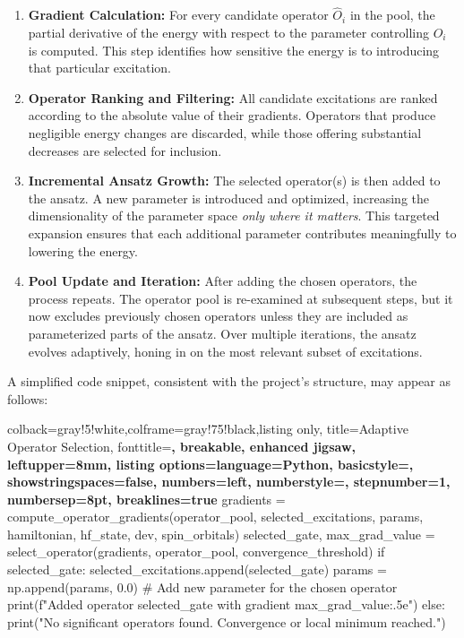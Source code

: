 \begin{enumerate}
    \item \textbf{Gradient Calculation:} For every candidate operator $\hat{O}_i$ in the pool, the partial derivative of the energy with respect to the parameter controlling $\hat{O}_i$ is computed. This step identifies how sensitive the energy is to introducing that particular excitation.
    \item \textbf{Operator Ranking and Filtering:} All candidate excitations are ranked according to the absolute value of their gradients. Operators that produce negligible energy changes are discarded, while those offering substantial decreases are selected for inclusion.
    \item \textbf{Incremental Ansatz Growth:} The selected operator(s) is then added to the ansatz. A new parameter is introduced and optimized, increasing the dimensionality of the parameter space \emph{only where it matters}. This targeted expansion ensures that each additional parameter contributes meaningfully to lowering the energy.
    \item \textbf{Pool Update and Iteration:} After adding the chosen operators, the process repeats. The operator pool is re-examined at subsequent steps, but it now excludes previously chosen operators unless they are included as parameterized parts of the ansatz. Over multiple iterations, the ansatz evolves adaptively, honing in on the most relevant subset of excitations.
\end{enumerate}

A simplified code snippet, consistent with the project’s structure, may appear as follows:

\begin{tcblisting}{colback=gray!5!white,colframe=gray!75!black,listing only,
  title=Adaptive Operator Selection, fonttitle=\bfseries, breakable, enhanced jigsaw, leftupper=8mm,
  listing options={language=Python, basicstyle=\ttfamily\small,
  showstringspaces=false, numbers=left, numberstyle=\footnotesize, stepnumber=1, numbersep=8pt, breaklines=true}}
gradients = compute_operator_gradients(operator_pool, selected_excitations, params, hamiltonian, hf_state, dev, spin_orbitals)
selected_gate, max_grad_value = select_operator(gradients, operator_pool, convergence_threshold)
if selected_gate:
    selected_excitations.append(selected_gate)
    params = np.append(params, 0.0)  # Add new parameter for the chosen operator
    print(f"Added operator {selected_gate} with gradient {max_grad_value:.5e}")
else:
    print("No significant operators found. Convergence or local minimum reached.")
\end{tcblisting}

